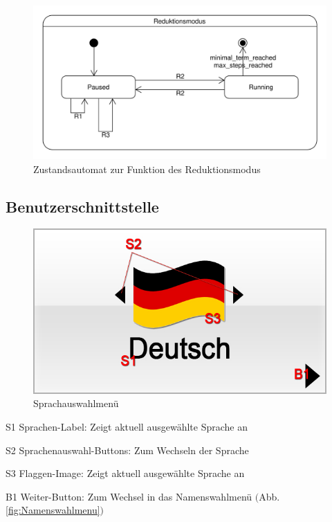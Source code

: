 \begin{figure}[H]
\centering
\includegraphics[scale=0.67]{../system_models/dynamic_models/reduction_mode_state_machine.pdf}
\caption{Zustandsautomat zur Funktion des Reduktionsmodus}
\end{figure}

\subsection{Benutzerschnittstelle}


\begin{figure}[H]
\centering
\includegraphics[scale=0.55]{../gui/_jpeg_numeration/registration1.jpg}
\caption{Sprachauswahlmenü}
\label{fig:Sprachauswahlmenu}
\end{figure}
\begin{description*}
\item[S1] Sprachen-Label: Zeigt aktuell ausgewählte Sprache an
\item[S2] Sprachenauswahl-Buttons: Zum Wechseln der Sprache
\item[S3] Flaggen-Image: Zeigt aktuell ausgewählte Sprache an
\item[B1] Weiter-Button: Zum Wechsel in das Namenswahlmenü $($Abb. \ref{fig:Namenswahlmenu}$)$
\end{description*}

